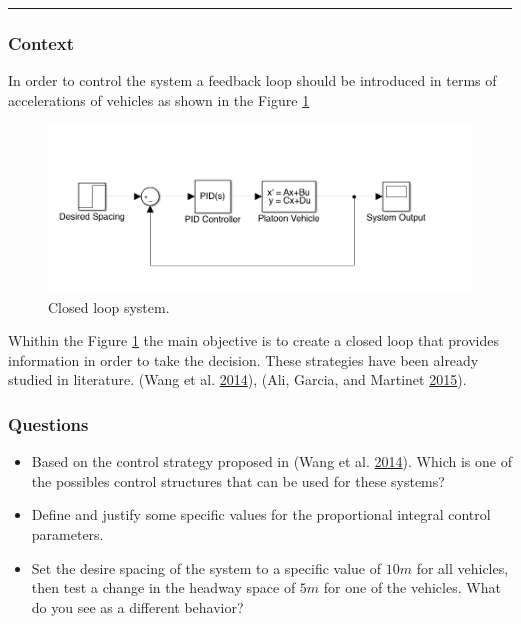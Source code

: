 \documentclass[]{book}
\providecommand{\tightlist}{%
  \setlength{\itemsep}{0pt}\setlength{\parskip}{0pt}}
\theoremstyle{definition}
\theoremstyle{definition}
\theoremstyle{definition}
\theoremstyle{remark}
\begin{document}
\begin{center}\rule{0.5\linewidth}{\linethickness}\end{center}

\hypertarget{context-7}{%
\subsubsection*{Context}\label{context-7}}

In order to control the system a feedback loop should be introduced in
terms of accelerations of vehicles as shown in the Figure
\ref{fig:closedcav}



\begin{figure}

{\centering \includegraphics{images/p2-03-closed-loop} 

}

\caption{Closed loop system.}\label{fig:closedcav}
\end{figure}

Whithin the Figure \ref{fig:closedcav} the main objective is to create a
closed loop that provides information in order to take the decision.
These strategies have been already studied in literature. (Wang et al.
\protect\hyperlink{ref-Meng2014b:TR-C}{2014}), (Ali, Garcia, and
Martinet \protect\hyperlink{ref-Ali2015:ITSM}{2015}).

\hypertarget{questions-6}{%
\subsubsection*{Questions}\label{questions-6}}

\begin{itemize}
\tightlist
\item
  Based on the control strategy proposed in (Wang et al.
  \protect\hyperlink{ref-Meng2014b:TR-C}{2014}). Which is one of the
  possibles control structures that can be used for these systems?
\item
  Define and justify some specific values for the proportional integral
  control parameters.
\item
  Set the desire spacing of the system to a specific value of \(10m\)
  for all vehicles, then test a change in the headway space of \(5m\)
  for one of the vehicles. What do you see as a different behavior?
\end{itemize}
\end{document}
